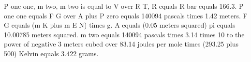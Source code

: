 P one one, m two, m two is equal to V over R T, R equals R bar equals 166.3.  
P one one equals F G over A plus P zero equals 140094 pascals times 1.42 meters.  
F G equals (m K plus m E N) times g.  
A equals (0.05 meters squared) pi equals 10.00785 meters squared.  
m two equals 140094 pascals times 3.14 times 10 to the power of negative 3 meters cubed over 83.14 joules per mole times (293.25 plus 500) Kelvin equals 3.422 grams.